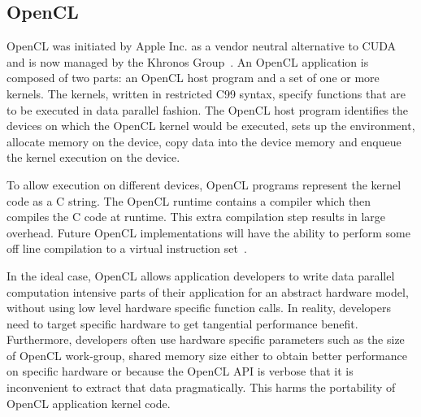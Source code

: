 
\subsection{OpenCL}

OpenCL was initiated by Apple Inc. as a vendor neutral alternative
to CUDA and is now managed by the Khronos Group~\cite{OpenCL_kh}.
An OpenCL application is composed of two parts: an OpenCL host program and a
set of one or more kernels. The kernels, written in restricted C99 syntax,
specify functions that are to be executed in data parallel fashion. The OpenCL
host program identifies the devices on which the OpenCL kernel would be
executed, sets up the environment, allocate memory on the device, copy data
into the device memory and enqueue the kernel execution on the device.


To allow execution on different devices, OpenCL programs represent the kernel
	code as a C string.
The OpenCL runtime contains a compiler which then compiles the C code at runtime.
This extra compilation step results in large overhead. Future OpenCL implementations
will have the ability to perform some off line compilation to a virtual instruction
set~\cite{SPIR}.

In the ideal case, OpenCL allows application developers to write
data parallel computation intensive parts of their application for an abstract
hardware model, without using low level hardware specific function calls.
In reality, developers need to target specific hardware to get tangential
performance benefit. Furthermore, developers often use hardware specific 
parameters such as the size of OpenCL work-group, shared memory size either 
to obtain better performance on specific hardware or because the OpenCL API
is verbose that it is inconvenient to extract that data pragmatically.
This harms the portability of OpenCL application kernel code.

